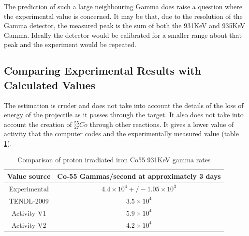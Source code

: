 The prediction of such a large neighbouring Gamma does raise a question where the experimental value is concerned.  It may be that, due to the resolution of the Gamma detector, the measured peak is the sum of both the 931KeV and 935KeV Gamma.  Ideally the detector would be calibrated for a smaller range about that peak and the experiment would be repeated.
 

\subsection{Comparing Experimental Results with Calculated Values}

The estimation is cruder and does not take into account the details of the loss of energy of the projectile as it passes through the target.  It also does not take into account the creation of ${}^{55}_{27} Co$ through other reactions.  It gives a lower value of activity that the computer codes and the experimentally measured value (table \ref{table:activityResultsCompared}).

\begin{table}[h]
\begin{center}
\begin{tabular}{c c}
\hline\hline
Value source & Co-55 Gammas/second at approximately 3 days \\
\hline\hline
Experimental & $4.4\times10^4 +/- 1.05 \times 10^3$ \\
TENDL-2009 & $3.5\times10^4$ \\
Activity V1 & $5.9\times10^4$ \\
Activity V2 & $4.2\times10^4$ \\
\hline\hline
\end{tabular}
\end{center}
\caption{Comparison of proton irradiated iron Co55 931KeV gamma rates}
\label{table:activityResultsCompared}
\end{table}



